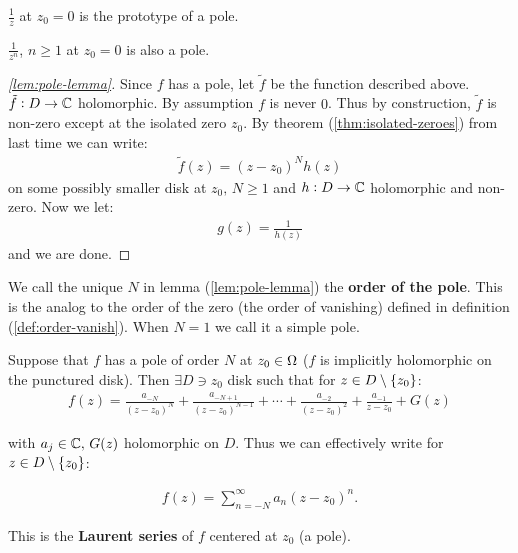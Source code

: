\begin{example}
$\frac{1}{z}$ at $z_0 = 0$ is the prototype of a pole.
\end{example}

\begin{example}
$\frac{1}{z^n}$, $n \geq 1$ at $z_0 = 0$ is also a pole.
\end{example}

\begin{proof}[\ref{lem:pole-lemma}]
Since $f$ has a pole, let $\tilde{f}$ be the function described above. $\tilde{f}: D \to \mathbb{C}$ holomorphic. By assumption $f$ is never $0$. Thus by construction, $\tilde{f}$ is non-zero except at the isolated zero $z_0$. By theorem (\ref{thm:isolated-zeroes}) from last time we can write:
\begin{align*}
    \tilde{f} (z) = (z-z_0)^N h(z) 
\end{align*}
on some possibly smaller disk at $z_0, \, N \geq 1$ and $h:D \to \mathbb{C}$ holomorphic and non-zero. Now we let:
\begin{align*}
    g(z) = \frac{1}{h(z)}
\end{align*}
and we are done.

\end{proof}

\begin{definition}
We call the unique $N$ in lemma (\ref{lem:pole-lemma}) the \textbf{order of the pole}. This is the analog to the order of the zero (the order of vanishing) defined in definition (\ref{def:order-vanish}). When $N=1$ we call it a simple pole.
\end{definition}


\begin{lemma}\label{lem:laurent-series}
Suppose that $f$ has a pole of order $N$ at $z_0 \in \Omega$ ($f$ is implicitly holomorphic on the punctured disk). Then $\exists D \ni z_0$ disk such that for $z\in D \setminus \{ z_0 \}$:
\begin{align*}
    f(z) = \frac{a_{-N}}{(z-z_0)^N} + \frac{a_{-N+1}}{(z-z_0)^{N-1}} + \cdots + \frac{a_{-2}}{(z-z_0)^2} + \frac{a_{-1}}{z-z_0} + G(z)
\end{align*}

with $a_j \in \mathbb{C}, \, G(z) $ holomorphic on $D$. Thus we can effectively write for $z \in D \setminus \{ z_0 \}$:

\begin{align*}
    f(z) = \sum_{n=-N}^\infty a_n (z-z_0)^n.
\end{align*}

This is the \textbf{Laurent series} of $f$ centered at $z_0$ (a pole).


\end{lemma}

